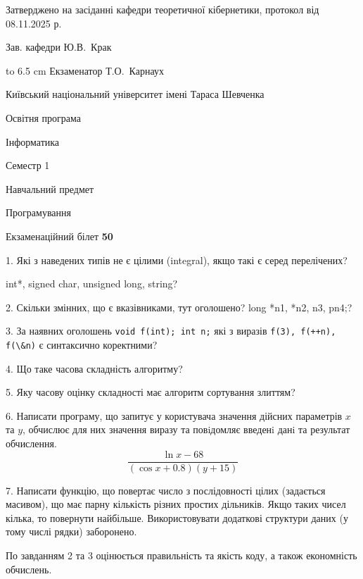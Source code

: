 \documentclass[12pt, ukrainian]{article}
\def\code#1{\Verb!#1!}
\begin{document}
{\smallskip\smallskip \begin {scriptsize} Затверджено на засіданні кафедри теоретичної кібернетики, протокол   від   08.11.2025 р.\par\smallskip\smallskip\smallskip\smallskip
{\parbox {6.5 cm} {Зав. кафедри \dotfill Ю.В.~Крак}}\hspace {0.7cm} {\hbox to 6.5 cm { Екзаменатор \dotfill Т.О.~Карнаух}} \end{scriptsize}}
\vspace{0.9cm}
{{\begin {scriptsize}\par
{ \center  Київський національний університет імені Тараса Шевченка \par}
{\parbox {5 cm}{Освітня програма \hfill}{\parbox {7 cm}{Інформатика\hfill}}\parbox {6 cm}{\hfill Семестр 1}}\par
{\parbox {5 cm} {Навчальний предмет \hfill}\parbox {7 cm}{Програмування \hfill}\parbox {6cm}{\hfill}\par}\vspace{-15pt} \end{scriptsize}}{\center Екзаменаційний білет \No \textbf { 50 }\par}}
{%
1. Які з наведених типів не є цілими (integral), якщо такі є серед перелічених?

int*, signed char, unsigned long, string?
\par
\vspace{2mm}
2. Скільки змінних, що є вказівниками, тут оголошено?
long *n1, *n2, n3, pn4;?
\par
\vspace{2mm}
3. За наявних оголошень \code{void f(int); int n;} які з виразів \code{f(3), f(++n), f(\&n)} є синтаксично коректними?
\par
\vspace{2mm}
4. Що таке часова складність алгоритму?
\par
\vspace{2mm}
5. Яку часову оцінку складності має алгоритм сортування злиттям?
\par
\vspace{2mm}
6. Написати програму, що запитує у користувача значення дійсних параметрів $x$ та $y$, обчислює для них значення виразу та повiдомляє введенi данi та результат обчислення.
$$\frac{\ln x - 68}{(\cos x + 0.8) (y + 15)}$$ 

\par
7. Написати функцію, що повертає число з послідовності цілих (задається масивом), що має парну кількість різних простих дільників. Якщо таких чисел кілька, то повернути найбільше. Використовувати додаткові структури даних (у тому числі рядки) заборонено.

По завданням 2 та 3 оцінюється правильність та якість коду, а також економність обчислень.

}
\end{document}
